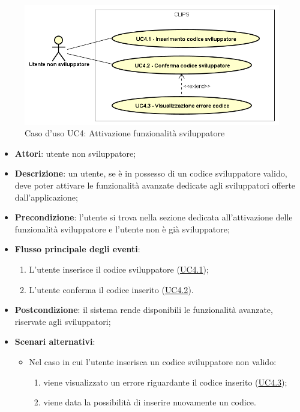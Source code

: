 \documentclass[../AnalisiDeiRequisiti.tex]{subfiles}
\begin{document}
\begin{figure}[H]
	\centering
	\includegraphics[scale=0.95, width=\textwidth]{img/UC4.png}
	\caption{Caso d'uso UC4: Attivazione funzionalità sviluppatore}\label{fig:UC4} 
\end{figure}
\begin{itemize}
	\item \textbf{Attori}: utente non sviluppatore;
	\item \textbf{Descrizione}: un utente, se è in possesso di un codice sviluppatore valido, deve poter attivare le funzionalità avanzate dedicate agli sviluppatori offerte dall'applicazione; 
	\item \textbf{Precondizione}: l'utente si trova nella sezione dedicata all'attivazione delle funzionalità sviluppatore e l'utente non è già sviluppatore;
	
	\item \textbf{Flusso principale degli eventi}:
	\begin{enumerate}
		\item L'utente inserisce il codice sviluppatore (\hyperlink{UC4.1}{UC4.1});
		\item L'utente conferma il codice inserito (\hyperlink{UC4.2}{UC4.2}).
		
	\end{enumerate}
	\item \textbf{Postcondizione}: il sistema rende disponibili le funzionalità avanzate, riservate agli sviluppatori;
	\item \textbf{Scenari alternativi}: 
	\begin{itemize}
		\item Nel caso in cui l'utente inserisca un codice sviluppatore non valido: 
		\begin{enumerate}
			\item viene visualizzato un errore riguardante il codice inserito (\hyperlink{UC4.3}{UC4.3});
			\item viene data la possibilità di inserire nuovamente un codice.
		\end{enumerate}
	\end{itemize}
\end{itemize}
\hypertarget{UC4.1}{}
\end{document}
